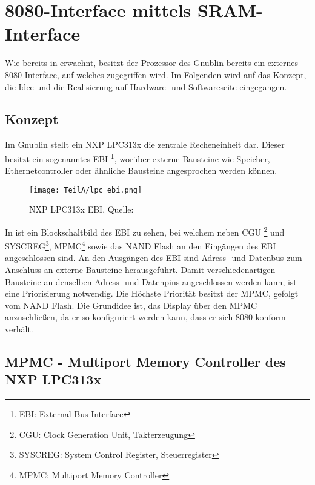 \section{8080-Interface mittels SRAM-Interface}
\label{sec:TeilA_8080SRAM}
Wie bereits in  erwaehnt, besitzt der Prozessor des Gnublin bereits ein externes 8080-Interface, auf welches zugegriffen wird. Im Folgenden wird auf das Konzept, die Idee und die Realisierung auf Hardware- und Softwareseite eingegangen.
\newpage
\subsection{Konzept}
Im Gnublin stellt ein NXP LPC313x die zentrale Recheneinheit dar. Dieser besitzt ein sogenanntes EBI \footnote{EBI: External Bus Interface}, worüber externe Bausteine wie Speicher, Ethernetcontroller oder ähnliche Bausteine angesprochen werden können. 


\begin{figure}[htp]
	\centering
	\texttt{[image: TeilA/lpc\_ebi.png]}
	\caption{NXP LPC313x EBI, Quelle: \cite{NXP2010}}
	\label{fig:lpc_ebi}
\end{figure}

In  ist ein Blockschaltbild des EBI zu sehen, bei welchem neben CGU \footnote{CGU: Clock Generation Unit, Takterzeugung} und SYSCREG\footnote{SYSCREG: System Control Register, Steuerregister}, MPMC\footnote{MPMC: Multiport Memory Controller} sowie das NAND Flash an den Eingängen des EBI angeschlossen sind. An den Ausgängen des EBI sind Adress- und Datenbus zum Anschluss an externe Bausteine herausgeführt. Damit verschiedenartigen Bausteine an denselben Adress- und Datenpins angeschlossen werden kann, ist eine Priorisierung notwendig. Die Höchste Priorität besitzt der MPMC, gefolgt vom NAND Flash. 
Die Grundidee ist, das Display über den MPMC anzuschließen, da er so konfiguriert werden kann, dass er sich 8080-konform verhält.


\subsection{MPMC - Multiport Memory Controller des NXP LPC313x}

